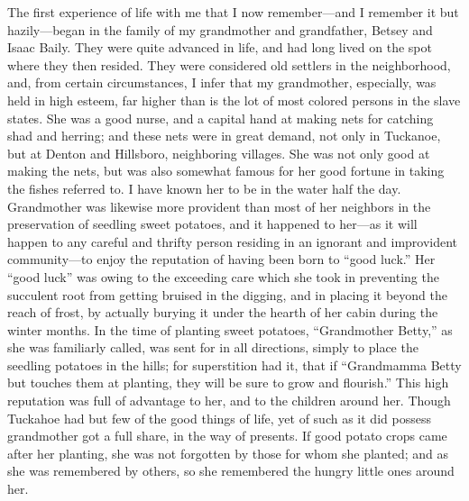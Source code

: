 The first experience of life with me that I now remember---and I
remember it but hazily---began in the family of my grandmother and
grandfather, Betsey and Isaac Baily. They were quite advanced in life,
and had long lived on the spot where they then resided. They were
considered old settlers in the neighborhood, and, from certain
circumstances, I infer that my grandmother, especially, was held in high
esteem, far higher than is the lot of most colored persons in the slave
states. She was a good nurse, and a capital hand at making nets for
catching shad and herring; and these nets were in great demand, not
{}only in Tuckanoe, but at Denton and Hillsboro, neighboring villages.
She was not only good at making the nets, but was also somewhat famous
for her good fortune in taking the fishes referred to. I have known her
to be in the water half the day. Grandmother was likewise more provident
than most of her neighbors in the preservation of seedling sweet
potatoes, and it happened to her---as it will happen to any careful and
thrifty person residing in an ignorant and improvident community---to
enjoy the reputation of having been born to ``good luck.'' Her ``good
luck'' was owing to the exceeding care which she took in preventing the
succulent root from getting bruised in the digging, and in placing it
beyond the reach of frost, by actually burying it under the hearth of
her cabin during the winter months. In the time of planting sweet
potatoes, ``Grandmother Betty,'' as she was familiarly called, was sent
for in all directions, simply to place the seedling potatoes in the
hills; for superstition had it, that if ``Grandmamma Betty but touches
them at planting, they will be sure to grow and flourish.'' This high
reputation was full of advantage to her, and to the children around her.
Though Tuckahoe had but few of the good things of life, yet of such as
it did possess grandmother got a full share, in the way of presents. If
good potato crops came after her planting, she was not forgotten by
those for whom she planted; and as she was remembered by others, so she
remembered the hungry little ones around her.

